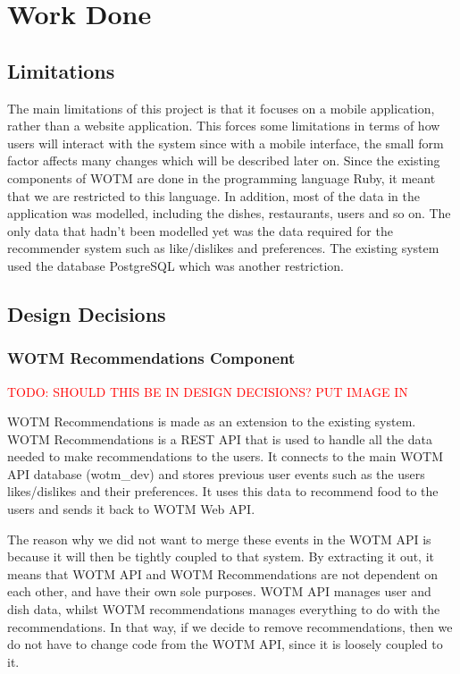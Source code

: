\chapter{Work Done}\label{C:work_done}

\section{Limitations}

The main limitations of this project is that it focuses on a mobile application, rather than a website application. This forces some limitations in terms of how users will interact with the system since with a mobile interface, the small form factor affects many changes which will be described later on. Since the existing components of WOTM are done in the programming language Ruby, it meant that we are restricted to this language. In addition, most of the data in the application was modelled, including the dishes, restaurants, users and so on. The only data that hadn't been modelled yet was the data required for the recommender system such as like/dislikes and preferences. The existing system used the database PostgreSQL which was another restriction.  

\section{Design Decisions}

\subsection{WOTM Recommendations Component}

\textcolor{red}{TODO: SHOULD THIS BE IN DESIGN DECISIONS? PUT IMAGE IN}

WOTM Recommendations is made as an extension to the existing system. WOTM Recommendations is a REST API that is used to handle all the data needed to make recommendations to the users. It connects to the main WOTM API database (wotm\_dev) and stores previous user events such as the users likes/dislikes and their preferences. It uses this data to recommend food to the users and sends it back to WOTM Web API. 

The reason why we did not want to merge these events in the WOTM API is because it will then be tightly coupled to that system. By extracting it out, it means that WOTM API and WOTM Recommendations are not dependent on each other, and have their own sole purposes. WOTM API manages user and dish data, whilst WOTM recommendations manages everything to do with the recommendations. In that way, if we decide to remove recommendations, then we do not have to change code from the WOTM API, since it is loosely coupled to it. 

